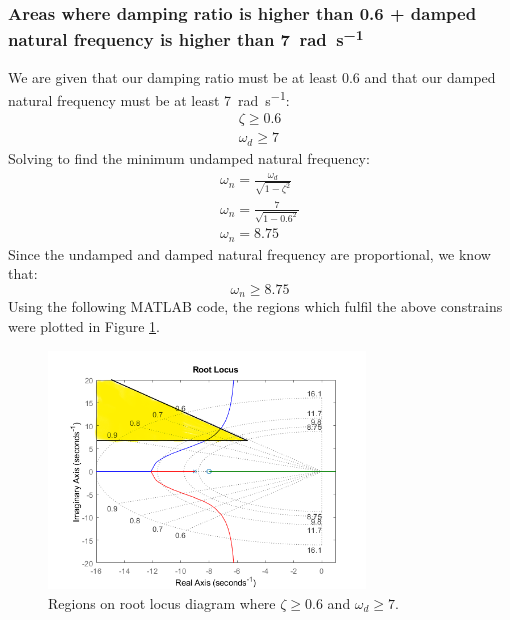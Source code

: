 \documentclass[11pt]{article}
\numberwithin{equation}{section}
\begin{document}
\subsubsection{Areas where damping ratio is higher than 0.6 + damped natural frequency is higher than \SI{7}{\radian\per\second}}
We are given that our damping ratio must be at least 0.6 and that our damped natural frequency must be at least \SI{7}{\radian\per\second}:
\begin{gather}
    \zeta \geq 0.6\\
    \omega_d \geq 7
\end{gather}
Solving to find the minimum undamped natural frequency:
\begin{gather}
    \omega_n = \frac{\omega_d}{\sqrt{1 - \zeta^2}}\\
    \omega_n = \frac{7}{\sqrt{1-0.6^2}}\\
    \omega_n = 8.75
\end{gather}
Since the undamped and damped natural frequency are proportional, we know that:
\begin{equation}
    \omega_n \geq 8.75
\end{equation}
Using the following MATLAB code, the regions which fulfil the above constrains were plotted in Figure \ref{q3cii}.

\begin{figure}[H]
    \centering
    \includegraphics[width = 0.75\textwidth]{./img/q3cii2.png}
    \caption{Regions on root locus diagram where $\zeta \geq 0.6$ and $\omega_d \geq 7$.}
    \label{q3cii}
\end{figure}
\end{document}
